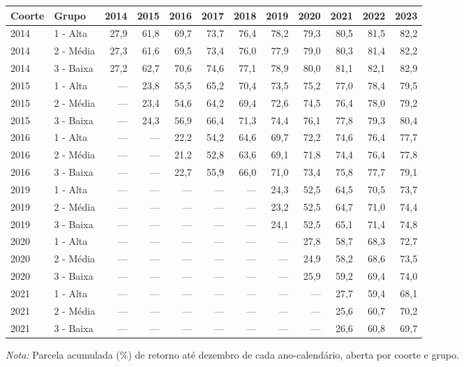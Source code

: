 \providecommand{\toprule}{\hline\hline}
\providecommand{\midrule}{\hline}
\providecommand{\bottomrule}{\hline\hline}
\providecommand{\addlinespace}[1][]{}
{\small
\renewcommand{\arraystretch}{1.12}
\begin{tabular}{llrrrrrrrrrr}
\toprule
Coorte & Grupo & 2014 & 2015 & 2016 & 2017 & 2018 & 2019 & 2020 & 2021 & 2022 & 2023 \\
\midrule
2014 & 1 - Alta & 27,9 & 61,8 & 69,7 & 73,7 & 76,4 & 78,2 & 79,3 & 80,5 & 81,5 & 82,2 \\
2014 & 2 - Média & 27,3 & 61,6 & 69,5 & 73,4 & 76,0 & 77,9 & 79,0 & 80,3 & 81,4 & 82,2 \\
2014 & 3 - Baixa & 27,2 & 62,7 & 70,6 & 74,6 & 77,1 & 78,9 & 80,0 & 81,1 & 82,1 & 82,9 \\
\addlinespace[3pt]
2015 & 1 - Alta & --- & 23,8 & 55,5 & 65,2 & 70,4 & 73,5 & 75,2 & 77,0 & 78,4 & 79,5 \\
2015 & 2 - Média & --- & 23,4 & 54,6 & 64,2 & 69,4 & 72,6 & 74,5 & 76,4 & 78,0 & 79,2 \\
2015 & 3 - Baixa & --- & 24,3 & 56,9 & 66,4 & 71,3 & 74,4 & 76,1 & 77,8 & 79,3 & 80,4 \\
\addlinespace[3pt]
2016 & 1 - Alta & --- & --- & 22,2 & 54,2 & 64,6 & 69,7 & 72,2 & 74,6 & 76,4 & 77,7 \\
2016 & 2 - Média & --- & --- & 21,2 & 52,8 & 63,6 & 69,1 & 71,8 & 74,4 & 76,4 & 77,8 \\
2016 & 3 - Baixa & --- & --- & 22,7 & 55,9 & 66,0 & 71,0 & 73,4 & 75,8 & 77,7 & 79,1 \\
\addlinespace[3pt]
2019 & 1 - Alta & --- & --- & --- & --- & --- & 24,3 & 52,5 & 64,5 & 70,5 & 73,7 \\
2019 & 2 - Média & --- & --- & --- & --- & --- & 23,2 & 52,5 & 64,7 & 71,0 & 74,4 \\
2019 & 3 - Baixa & --- & --- & --- & --- & --- & 24,1 & 52,5 & 65,1 & 71,4 & 74,8 \\
\addlinespace[3pt]
2020 & 1 - Alta & --- & --- & --- & --- & --- & --- & 27,8 & 58,7 & 68,3 & 72,7 \\
2020 & 2 - Média & --- & --- & --- & --- & --- & --- & 24,9 & 58,2 & 68,6 & 73,5 \\
2020 & 3 - Baixa & --- & --- & --- & --- & --- & --- & 25,9 & 59,2 & 69,4 & 74,0 \\
\addlinespace[3pt]
2021 & 1 - Alta & --- & --- & --- & --- & --- & --- & --- & 27,7 & 59,4 & 68,1 \\
2021 & 2 - Média & --- & --- & --- & --- & --- & --- & --- & 25,6 & 60,7 & 70,2 \\
2021 & 3 - Baixa & --- & --- & --- & --- & --- & --- & --- & 26,6 & 60,8 & 69,7 \\
\bottomrule
\end{tabular}
\vspace{2pt}
\par{\footnotesize \textit{Nota:} Parcela acumulada (\%) de retorno até dezembro de cada ano-calendário, aberta por coorte e grupo.}
}
